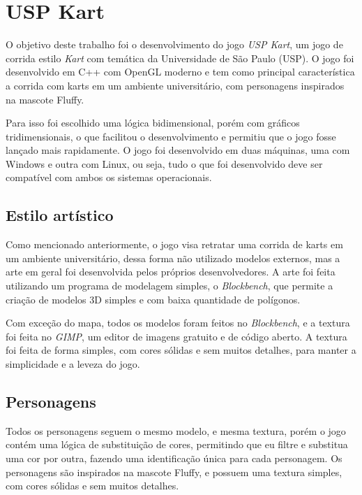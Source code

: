 \chapter{USP Kart}

O objetivo deste trabalho foi o desenvolvimento do jogo \textit{USP Kart}, um jogo de corrida estilo \textit{Kart} com temática da Universidade de São Paulo (USP). O jogo foi desenvolvido em C++ com OpenGL moderno e tem como principal característica a corrida com karts em um ambiente universitário, com personagens inspirados na mascote Fluffy.

Para isso foi escolhido uma lógica bidimensional, porém com gráficos tridimensionais, o que facilitou o desenvolvimento e permitiu que o jogo fosse lançado mais rapidamente. O jogo foi desenvolvido em duas máquinas, uma com Windows e outra com Linux, ou seja, tudo o que foi desenvolvido deve ser compatível com ambos os sistemas operacionais.

\section{Estilo artístico}

Como mencionado anteriormente, o jogo visa retratar uma corrida de karts em um ambiente universitário, dessa forma não utilizado modelos externos, mas a arte em geral foi desenvolvida pelos próprios desenvolvedores. A arte foi feita utilizando um programa de modelagem simples, o \textit{Blockbench}, que permite a criação de modelos 3D simples e com baixa quantidade de polígonos.

Com exceção do mapa, todos os modelos foram feitos no \textit{Blockbench}, e a textura foi feita no \textit{GIMP}, um editor de imagens gratuito e de código aberto. A textura foi feita de forma simples, com cores sólidas e sem muitos detalhes, para manter a simplicidade e a leveza do jogo.

\pagebreak

\section{Personagens}

Todos os personagens seguem o mesmo modelo, e mesma textura, porém o jogo contém uma lógica de substituição de cores, permitindo que eu filtre e substitua uma cor por outra, fazendo uma identificação única para cada personagem. Os personagens são inspirados na mascote Fluffy, e possuem uma textura simples, com cores sólidas e sem muitos detalhes.

